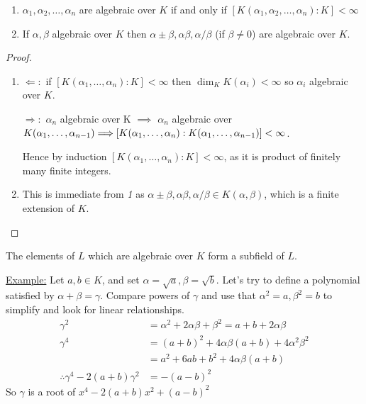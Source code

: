 \documentclass[a4paper, 10pt, twocolumn]{amsart}
\begin{document}
\begin{corollary}\item
\begin{enumerate}
\item $\alpha_1, \alpha_2, \ldots, \alpha_n$ are algebraic over $K$ if and only if $[K(\alpha_1, \alpha_2, \ldots, \alpha_n):K] < \infty$
\item If $\alpha, \beta$ algebraic over $K$ then $\alpha \pm \beta, \alpha\beta, \alpha/\beta$ (if $\beta \neq 0$) are algebraic over $K$.
\end{enumerate}
\begin{proof}
\item
\begin{enumerate}
\item $\Longleftarrow:$ if $[K(\alpha_1, \ldots, \alpha_n):K] < \infty$ then $\dim_K K(\alpha_i) <\infty$ so $\alpha_i$ algebraic over $K$.

$\Longrightarrow:$ $\alpha_n$ algebraic over K $\implies$ $\alpha_n$ algebraic over $K(\alpha_1, \ldots, \alpha_{n-1}) \\\Longrightarrow [K(\alpha_1, \ldots, \alpha_n):K(\alpha_1, \ldots, \alpha_{n-1})] < \infty$.

Hence by induction $[K(\alpha_1, \ldots, \alpha_n):K] < \infty$, as it is product of finitely many finite integers.
\item This is immediate from \textit{1} as $\alpha\pm \beta, \alpha\beta, \alpha/\beta \in K(\alpha,\beta)$, which is a finite extension of $K$.
\end{enumerate}
\end{proof}
\end{corollary}

\begin{corollary}
The elements of $L$ which are algebraic over $K$ form a subfield of $L$.
\end{corollary}
\underline{Example:} Let $a,b \in K$, and set $\alpha=\sqrt{a}, \beta=\sqrt{b}$. Let's try to define a polynomial satisfied by $\alpha+\beta=\gamma$. Compare powers of $\gamma$ and use that $\alpha^2 = a, \beta^2 = b$ to simplify and look for linear relationships.
\begin{align*}
\gamma^2 &= \alpha^2 + 2\alpha\beta + \beta^2 = a+b+2\alpha\beta\\
\gamma^4 &= (a+b)^2 + 4\alpha\beta(a+b) + 4\alpha^2\beta^2\\
&= a^2 + 6ab + b^2 + 4\alpha\beta(a+b)\\
\therefore \gamma^4-2(a+b)\gamma^2 &= -(a-b)^2
\end{align*}
So $\gamma$ is a root of $x^4-2(a+b)x^2+(a-b)^2$
\end{document}
